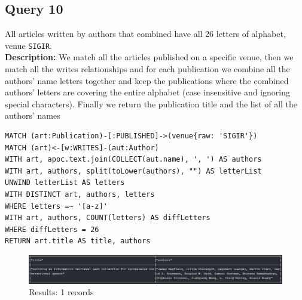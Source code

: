 \documentclass{Configuration_Files/PoliMi3i_thesis}
\begin{document}
\subsection{Query 10}
All articles written by authors that combined have all 26 letters of alphabet, venue \verb |SIGIR|.\\
\textbf{Description:} We match all the articles published on a specific venue, then we match all the writes relationships
and for each publication we combine all the authors' name letters together and keep the publications where the combined
authors' letters are covering the entire alphabet (case insensitive and ignoring special characters). Finally we return
the publication title and the list of all the authors' names
\begin{lstlisting}[language=cypher, label=lst:cypher-example]
MATCH (art:Publication)-[:PUBLISHED]->(venue{raw: 'SIGIR'})
MATCH (art)<-[w:WRITES]-(aut:Author)
WITH art, apoc.text.join(COLLECT(aut.name), ', ') AS authors
WITH art, authors, split(toLower(authors), "") AS letterList
UNWIND letterList AS letters
WITH DISTINCT art, authors, letters
WHERE letters =~ '[a-z]'
WITH art, authors, COUNT(letters) AS diffLetters
WHERE diffLetters = 26
RETURN art.title AS title, authors
\end{lstlisting}
\begin{figure}[H]
\centering
\includegraphics[width=1\textwidth]{query/query10.PNG}
\caption{Results: 1 records}
\label{fig:query10}
\end{figure}
\end{document}
